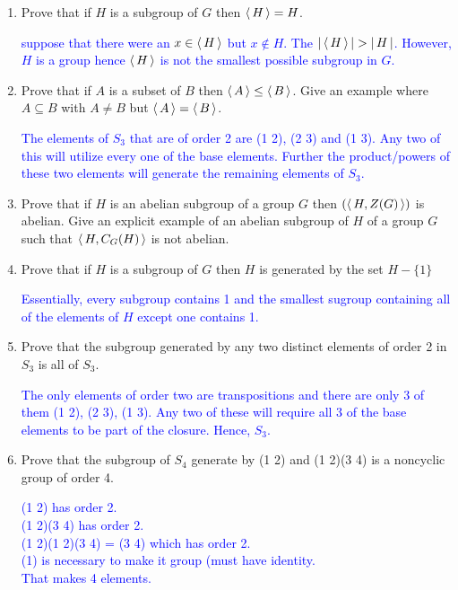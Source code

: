 \documentclass[10pt,a4paper]{report}
\newcommand{\BLUE}[1]{\textcolor{blue}{#1}}
\begin{document}
\begin{enumerate}

\item Prove that if $H$ is a subgroup of $G$ then $\left \langle\, H \,\right \rangle = H$.

\BLUE{suppose that there were an $x\in \left \langle\, H \,\right \rangle$ but $x\not \in H$.  The $\left |\, \left \langle\, H \,\right \rangle \,\right | > \left |\, H \,\right |$.  However, $H$ is a group hence $\left \langle\, H \,\right \rangle$ is not the smallest possible subgroup in $G$.
}

\item Prove that if $A$ is a subset of $B$ then $\left \langle\, A \,\right \rangle\le \left \langle\, B \,\right \rangle$.  Give an example where $A \subseteq B$ with $A \ne B$ but $\left \langle\, A \,\right \rangle=\left \langle\, B \,\right \rangle$.

\BLUE{The elements of $S_3$ that are of order 2 are (1 2), (2 3) and (1 3).  Any two of this will utilize every one of the base elements.  Further the product/powers of these two elements will generate the remaining elements of $S_3$.
}

\item Prove that if $H$ is an abelian subgroup of a group $G$ then $(\left \langle\, H, Z(G) \,\right \rangle)$ is abelian.  Give an explicit example of an abelian subgroup of $H$ of a group $G$ such that $\left \langle\, H, C_G(H) \,\right \rangle$ is not abelian.

\item Prove that if $H$ is a subgroup of $G$ then $H$ is generated by the set $H - \{1\}$

\BLUE{Essentially, every subgroup contains 1 and the smallest sugroup containing all of the elements of $H$ except one contains 1.
}

\item Prove that the subgroup generated by any two distinct elements of order 2 in $S_3$ is all of $S_3$.

\BLUE{The only elements of order two are transpositions and there are only 3 of them (1 2), (2 3), (1 3).  Any two of these will require all 3 of the base elements to be part of the closure.  Hence, $S_3$.
}

\item Prove that the subgroup of $S_4$ generate by (1 2) and (1 2)(3 4) is a noncyclic group of order 4.

\BLUE{(1 2) has order 2.\\
(1 2)(3 4) has order 2.\\
(1 2)(1 2)(3 4) = (3 4) which has order 2.\\
(1) is necessary to make it group (must have identity.\\
That makes 4 elements.
}


\end{enumerate}
\end{document}
